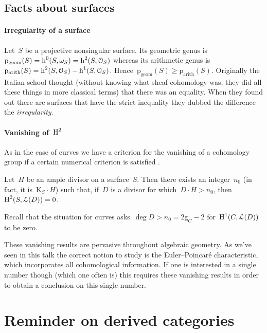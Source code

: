\documentclass[10pt,a4paper]{article}
\begin{document}
\subsection{Facts about surfaces}
\label{subsection:facts-surfaces}
\paragraph{Irregularity of a surface}
Let~$S$ be a projective nonsingular surface. Its geometric genus is~$\mathrm{p}_{\mathrm{geom}}(S)=\operatorname{h}^0(S,\omega_S)=\operatorname{h}^2(S,\mathcal{O}_S)$ whereas its arithmetic genus is~$\mathrm{p}_{\mathrm{arith}}(S)=\operatorname{h}^2(S,\mathcal{O}_S)-\operatorname{h}^1(S,\mathcal{O}_S)$. Hence~$\mathrm{p}_{\mathrm{geom}}(S)\geq\mathrm{p}_{\mathrm{arith}}(S)$. Originally the Italian school thought (without knowing what sheaf cohomology was, they did all these things in more classical terms) that there was an equality. When they found out there are surfaces that have the strict inequality they dubbed the difference the \emph{irregularity}.

\paragraph{Vanishing of~$\operatorname{H}^2$}
As in the case of curves we have a criterion for the vanishing of a cohomology group if a certain numerical criterion is satisfied \cite[lemma V.1.7]{hartshorne-algebraic-geometry}.
\begin{proposition}
  Let~$H$ be an ample divisor on a surface~$S$. Then there exists an integer~$n_0$ (in fact, it is~$\mathrm{K}_S\cdot H$) such that, if~$D$ is a divisor for which~$D\cdot H>n_0$, then~$\operatorname{H}^2(S,\mathcal{L}(D))=0$.
\end{proposition}
Recall that the situation for curves asks~$\deg D>n_0=2\mathrm{g}_C-2$ for~$\operatorname{H}^1(C,\mathcal{L}(D))$ to be zero.

These vanishing results are pervasive throughout algebraic geometry. As we've seen in this talk the correct notion to study is the Euler--Poincar\'e characteristic, which incorporates all cohomological information. If one is interested in a single number though (which one often is) this requires these vanishing results in order to obtain a conclusion on this single number.


\section{Reminder on derived categories}
\label{section:derived-categories}
\end{document}
